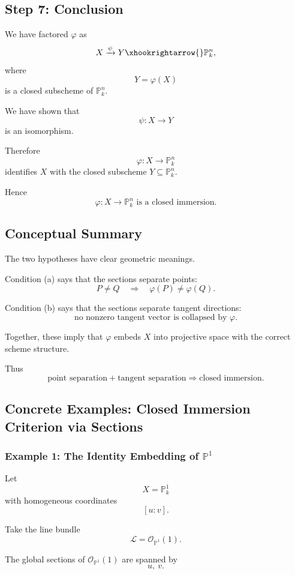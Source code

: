 \subsection*{Step 7: Conclusion}

We have factored $\varphi$ as
\[
X\xrightarrow{\psi}Y\xhookrightarrow{} \mathbb P_k^n,
\]
where
\[
Y=\varphi(X)
\]
is a closed subscheme of $\mathbb P_k^n$.

We have shown that
\[
\psi:X\to Y
\]
is an isomorphism.

Therefore
\[
\varphi:X\to\mathbb P_k^n
\]
identifies $X$ with the closed subscheme $Y\subseteq\mathbb P_k^n$.

Hence
\[
\boxed{
	\varphi:X\to\mathbb P_k^n
	\text{ is a closed immersion.}
}
\]

\subsection*{Conceptual Summary}

The two hypotheses have clear geometric meanings.

Condition (a) says that the sections separate points:
\[
P\neq Q
\quad\Longrightarrow\quad
\varphi(P)\neq\varphi(Q).
\]

Condition (b) says that the sections separate tangent directions:
\[
\text{no nonzero tangent vector is collapsed by }\varphi.
\]

Together, these imply that $\varphi$ embeds $X$ into projective space with
the correct scheme structure.

Thus
\[
\boxed{
	\text{point separation}+\text{tangent separation}
	\Longrightarrow
	\text{closed immersion}.
}
\]
\subsection*{Concrete Examples: Closed Immersion Criterion via Sections}

\subsubsection*{Example 1: The Identity Embedding of \texorpdfstring{$\mathbb P^1$}{P1}}

Let
\[
X=\mathbb P^1_k
\]
with homogeneous coordinates
\[
[u:v].
\]

Take the line bundle
\[
\mathcal L=\mathcal O_{\mathbb P^1}(1).
\]

The global sections of \(\mathcal O_{\mathbb P^1}(1)\) are spanned by
\[
u,\ v.
\]

